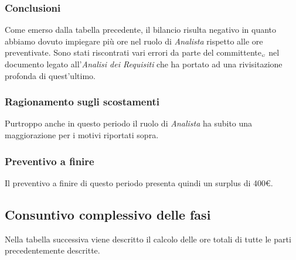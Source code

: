 {{{{{{{{{{{\subsubsection{Conclusioni}\label{ConsuntivoTerzoPeriodoDiProgettazioneDiDettaglioCodificaConclusioni}
Come emerso dalla tabella precedente, il bilancio risulta negativo in quanto abbiamo dovuto impiegare più ore nel ruolo di \textit{Analista} rispetto alle ore preventivate. Sono stati riscontrati vari errori da parte del committente$_{\scaleto{G}{3pt}}$ nel documento legato all'\textit{Analisi dei Requisiti} che ha portato ad una rivisitazione profonda di quest'ultimo.
		
				
\subsubsection{Ragionamento sugli scostamenti}\label{ConsuntivoTerzoPeriodoDiProgettazioneDiDettaglioCodificaRagionamentoScostamenti}
Purtroppo anche in questo periodo il ruolo di \textit{Analista} ha subito una maggiorazione per i motivi riportati sopra. 
		
\subsubsection{Preventivo a finire}\label{ConsuntivoTerzoPeriodoDiProgettazioneDiDettaglioCodificaPreventivoFinire}
Il preventivo a finire di questo periodo presenta quindi un surplus di 400\euro. 
		
\subsection{Consuntivo complessivo delle fasi}\label{ConsuntivoPeriodoDiProgettazioneDettaglioCodificaComplessivoDelleFasi}
			
			Nella tabella successiva viene descritto il calcolo delle ore totali di tutte le parti precedentemente descritte.
			
}}}}}}}}}}}
